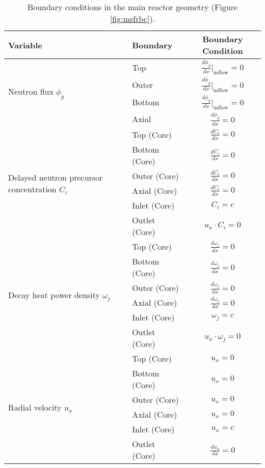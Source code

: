 \begin{table}[htbp!]
    \small
	\caption{Boundary conditions in the main reactor geometry (Figure
	\ref{fig:msfrbc}).}
	\centering
	\begin{tabular}{ l l c}
		\toprule
		Variable & Boundary & Boundary Condition \\
		\midrule
		\multirow{4}{*}{Neutron flux $\phi_g$} & Top & $\frac{d \phi_g}{dx}
		\big|_{\text{inflow}} = 0$ \\[.5ex]
        & Outer & $\frac{d \phi_g}{dx} \big|_{\text{inflow}} = 0$ \\[.5ex]
        & Bottom & $\frac{d \phi_g}{dx} \big|_{\text{inflow}} = 0$ \\[.5ex]
        & Axial & $\frac{d \phi_g}{dx} = 0$ \\[.5ex]
        \midrule
        \multirow{6}{*}{Delayed neutron precursor concentration $C_i$} &
        Top (Core) & $\frac{d C_i}{dx} = 0$ \\[.5ex]
        & Bottom (Core) & $\frac{d C_i}{dx} = 0$ \\[.5ex]
        & Outer (Core) & $\frac{d C_i}{dx} = 0$ \\[.5ex]
        & Axial (Core) & $\frac{d C_i}{dx} = 0$ \\[.5ex]
        & Inlet (Core) & $C_i = c$ \\
        & Outlet (Core) & $u_x \cdot C_i = 0$ \\
        \midrule
        \multirow{6}{*}{Decay heat power density $\omega_j$} &
        Top (Core) & $\frac{d \omega_j}{dx} = 0$ \\[.5ex]
        & Bottom (Core) & $\frac{d \omega_j}{dx} = 0$ \\[.5ex]
        & Outer (Core) & $\frac{d \omega_j}{dx} = 0$ \\[.5ex]
        & Axial (Core) & $\frac{d \omega_j}{dx} = 0$ \\[.5ex]
        & Inlet (Core) & $\omega_j = c$ \\
        & Outlet (Core) & $u_x \cdot \omega_j = 0$ \\
        \midrule
        \multirow{6}{*}{Radial velocity $u_x$} & Top (Core) & $u_x = 0$ \\
        & Bottom (Core) & $u_x = 0$ \\
        & Outer (Core) & $u_x = 0$ \\
        & Axial (Core) & $u_x = 0$ \\
        & Inlet (Core) & $u_x = c$ \\
        & Outlet (Core) & $\frac{d u_x}{dx} = 0$ \\[.5ex]

\end{tabular}
\end{table}
